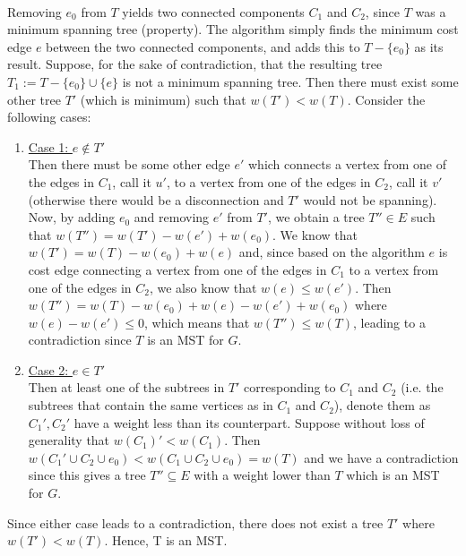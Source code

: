\documentclass[a4paper,twoside,10pt]{report}
\newcommand{\marginline}{\noindent\makebox[\linewidth][r]{\rule{\textwidth}{1pt}}}
\newcommand{\exer}[1]{\noindent{\Large\textsc{Question #1}} \\ \marginline}
\newenvironment{exercise}[1]{\exer{#1}}{}
\begin{document}
\begin{exercise}{1b}
Removing $e_0$ from $T$ yields two connected components $C_1$ and $C_2$, since $T$ was a minimum spanning tree (property). The algorithm simply finds the minimum cost edge $e$ between the two connected components, and adds this to $T - \{e_0\}$ as its result. Suppose, for the sake of contradiction, that the resulting tree $T_1 := T - \{e_0\} \cup \{e\}$ is not a minimum spanning tree. Then there must exist some other tree $T'$ (which is minimum) such that $w(T') < w(T)$. Consider the following cases:
\begin{enumerate}
\item \underline{Case 1: $e \notin T'$} \\
Then there must be some other edge $e'$ which connects a vertex from one of the edges in $C_1$, call it $u'$, to a vertex from one of the edges in $C_2$, call it $v'$ (otherwise there would be a disconnection and $T'$ would not be spanning). Now, by adding $e_{0}$ and removing $e'$ from $T'$, we obtain a tree $T'' \in E$ such that $w(T'') = w(T') - w(e') + w(e_0)$. We know that $w(T') = w(T) - w(e_0) + w(e)$ and, since based on the algorithm $e$ is cost edge connecting a vertex from one of the edges in $C_1$ to a vertex from one of the edges in $C_2$, we also know that $w(e) \leq w(e')$. Then $w(T'') = w(T) - w(e_0) + w(e) - w(e') + w(e_0)$ where $w(e) - w(e') \leq 0$, which means that $w(T'') \leq w(T)$, leading to a contradiction since $T$ is an MST for $G$.
\item \underline{Case 2: $e \in T'$} \\
Then at least one of the subtrees in $T'$ corresponding to $C_1$ and $C_2$ (i.e. the subtrees that contain the same vertices as in $C_1$ and $C_2$), denote them as $C_1', C_2'$ have a weight less than its counterpart. Suppose without loss of generality that $w(C_1)' < w(C_1)$. Then $w(C_1' \cup C_2 \cup e_0) < w(C_1 \cup C_2 \cup e_0) = w(T)$ and we have a contradiction since this gives a tree $T'' \subseteq E$ with a weight lower than $T$ which is an MST for $G$.
\end{enumerate}
Since either case leads to a contradiction, there does not exist a tree $T'$ where $w(T') < w(T)$. Hence, T is an MST.
\end{exercise}
\end{document}
